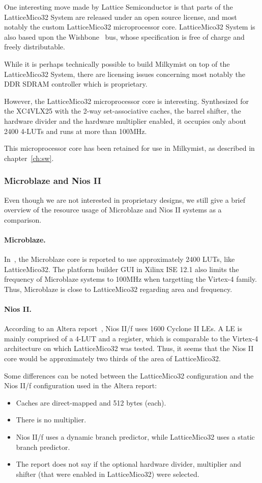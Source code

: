 \documentclass[a4paper,11pt]{kthesis}
\begin{document}
One interesting move made by Lattice Semiconductor is that parts of the LatticeMico32 System are released under an open source license, and most notably the custom LatticeMico32 microprocessor core. LatticeMico32 System is also based upon the Wishbone~\cite{wishbone} bus, whose specification is free of charge and freely distributable.

While it is perhaps technically possible to build Milkymist on top of the LatticeMico32 System, there are licensing issues concerning most notably the DDR SDRAM controller which is proprietary.

However, the LatticeMico32 microprocessor core is interesting. Synthesized for the XC4VLX25 with the 2-way set-associative caches, the barrel shifter, the hardware divider and the hardware multiplier enabled, it occupies only about 2400 4-LUTs and runs at more than 100MHz.

This microprocessor core has been retained for use in Milkymist, as described in chapter~\ref{ch:sw}.

\subsubsection{Microblaze and Nios II}
Even though we are not interested in proprietary designs, we still give a brief overview of the resource usage of Microblaze and Nios II systems as a comparison.

\paragraph{Microblaze.} In~\cite{softcorecomp}, the Microblaze core is reported to use approximately 2400 LUTs, like LatticeMico32. The platform builder GUI in Xilinx ISE 12.1 also limits the frequency of Microblaze systems to 100MHz when targetting the Virtex-4 family. Thus, Microblaze is close to LatticeMico32 regarding area and frequency.

\paragraph{Nios II.} According to an Altera report~\cite{niosbench}, Nios II/f uses 1600 Cyclone II LEs. A LE is mainly comprised of a 4-LUT and a register, which is comparable to the Virtex-4 architecture on which LatticeMico32 was tested. Thus, it seems that the Nios II core would be approximately two thirds of the area of LatticeMico32.

Some differences can be noted between the LatticeMico32 configuration and the Nios II/f configuration used in the Altera report:
\begin{itemize}
\item Caches are direct-mapped and 512 bytes (each).
\item There is no multiplier.
\item Nios II/f uses a dynamic branch predictor, while LatticeMico32 uses a static branch predictor.
\item The report does not say if the optional hardware divider, multiplier and shifter (that were enabled in LatticeMico32) were selected.
\end{itemize}
\end{document}
